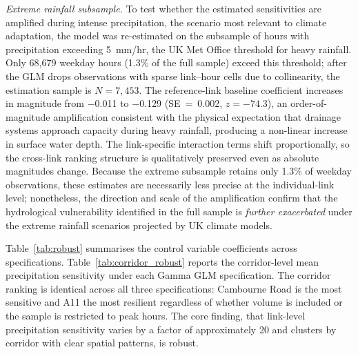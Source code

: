 \documentclass[review,authoryear]{elsarticle}
\begin{document}
\textit{Extreme rainfall subsample.} To test whether the estimated sensitivities are amplified during intense precipitation, the scenario most relevant to climate adaptation, the model was re-estimated on the subsample of hours with precipitation exceeding 5~\si{mm/hr}, the UK Met Office threshold for heavy rainfall. Only 68,679 weekday hours (1.3\% of the full sample) exceed this threshold; after the GLM drops observations with sparse link--hour cells due to collinearity, the estimation sample is $N = 7{,}453$. The reference-link baseline coefficient increases in magnitude from $-$0.011 to $-$0.129 (SE~=~0.002, $z = -74.3$), an order-of-magnitude amplification consistent with the physical expectation that drainage systems approach capacity during heavy rainfall, producing a non-linear increase in surface water depth. The link-specific interaction terms shift proportionally, so the cross-link ranking structure is qualitatively preserved even as absolute magnitudes change. Because the extreme subsample retains only 1.3\% of weekday observations, these estimates are necessarily less precise at the individual-link level; nonetheless, the direction and scale of the amplification confirm that the hydrological vulnerability identified in the full sample is \textit{further exacerbated} under the extreme rainfall scenarios projected by UK climate models.

Table~\ref{tab:robust} summarises the control variable coefficients across specifications. Table~\ref{tab:corridor_robust} reports the corridor-level mean precipitation sensitivity under each Gamma GLM specification. The corridor ranking is identical across all three specifications: Cambourne Road is the most sensitive and A11 the most resilient regardless of whether volume is included or the sample is restricted to peak hours. The core finding, that link-level precipitation sensitivity varies by a factor of approximately 20 and clusters by corridor with clear spatial patterns, is robust.
\end{document}
